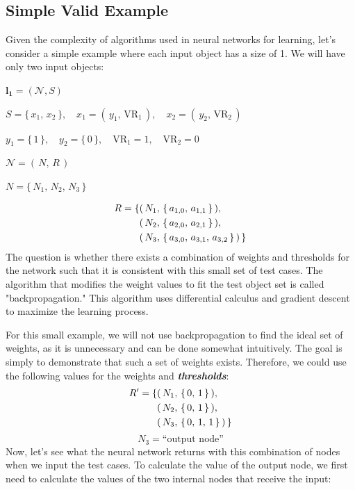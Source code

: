 \documentclass[../main]{subfiles}
\begin{document}
\subsection{Simple Valid Example}
Given the complexity of algorithms used in neural networks for learning, let's consider a simple example where each input object has a size of 1. We will have only two input objects:
\begin{center}
    $\textbf{l}_\textbf{1} = (\mathcal{N}, S)$
    
    $S = \{ \, x_1, \, x_2 \, \}, \quad x_1 = (\, y_1, \, \text{VR}_1 \,),  \quad x_2 = (\, y_2, \, \text{VR}_2\, )  $
    
    $y_1 = \{ \, 1 \, \},  \quad y_2 = \{ \, 0 \, \}, \quad \text{VR}_1 = 1, \quad \text{VR}_2 = 0$
    
    $\mathcal{N} = (\, N,\, R \, )$
    
    $N = \{ \, N_1,\, N_2,\, N_3 \, \}$
\end{center}
\begin{equation*}
\begin{aligned}
   R = \{ & (\,N_1, \, \{ \, a_{1,0}, \, a_{1,1} \, \}\,), \\
          & (\,N_2, \, \{ \, a_{2,0}, \, a_{2,1} \, \}\,), \\
          & (\,N_3, \, \{ \, a_{3,0}, \,a_{3,1}, \, a_{3,2} \, \}\,) \, \}
\end{aligned} \vspace{2mm}
\end{equation*}
The question is whether there exists a combination of weights and thresholds for the network such that it is consistent with this small set of test cases. The algorithm that modifies the weight values to fit the test object set is called "backpropagation." This algorithm uses differential calculus and gradient descent to maximize the learning process.

For this small example, we will not use backpropagation to find the ideal set of weights, as it is unnecessary and can be done somewhat intuitively. The goal is simply to demonstrate that such a set of weights exists. Therefore, we could use the following values for the weights and \textbf{\textit{thresholds}}:\vspace{2mm}
\begin{equation*}
\begin{aligned}
   R' = \{ & (\,N_1, \, \{ \, 0, \, 1 \, \}\,), \\
          & (\,N_2, \, \{ \, 0, \, 1 \, \}\,), \\
          & (\,N_3, \, \{ \, 0, \,1, \, 1 \, \}\,) \, \}    
\end{aligned} \vspace{2mm}
\end{equation*}
\begin{equation*}
    N_3 = \text{``output node''}
\end{equation*}
Now, let’s see what the neural network returns with this combination of nodes when we input the test cases. To calculate the value of the output node, we first need to calculate the values of the two internal nodes that receive the input:
\end{document}
